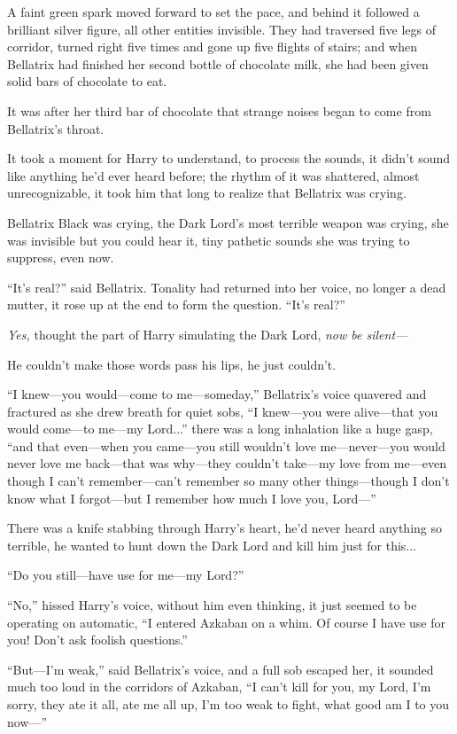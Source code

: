 \lettrine{A}{} faint green spark moved forward to set the pace, and behind it followed a brilliant silver figure, all other entities invisible. They had traversed five legs of corridor, turned right five times and gone up five flights of stairs; and when Bellatrix had finished her second bottle of chocolate milk, she had been given solid bars of chocolate to eat.

It was after her third bar of chocolate that strange noises began to come from Bellatrix’s throat.

It took a moment for Harry to understand, to process the sounds, it didn’t sound like anything he’d ever heard before; the rhythm of it was shattered, almost unrecognizable, it took him that long to realize that Bellatrix was crying.

Bellatrix Black was crying, the Dark Lord’s most terrible weapon was crying, she was invisible but you could hear it, tiny pathetic sounds she was trying to suppress, even now.

“It’s real?” said Bellatrix. Tonality had returned into her voice, no longer a dead mutter, it rose up at the end to form the question. “It’s real?”

\emph{Yes,} thought the part of Harry simulating the Dark Lord, \emph{now be silent—}

He couldn’t make those words pass his lips, he just couldn’t.

“I knew—you would—come to me—someday,” Bellatrix’s voice quavered and fractured as she drew breath for quiet sobs, “I knew—you were alive—that you would come—to me—my Lord...” there was a long inhalation like a huge gasp, “and that even—when you came—you still wouldn’t love me—never—you would never love me back—that was why—they couldn’t take—my love from me—even though I can’t remember—can’t remember so many other things—though I don’t know what I forgot—but I remember how much I love you, Lord—”

There was a knife stabbing through Harry’s heart, he’d never heard anything so terrible, he wanted to hunt down the Dark Lord and kill him just for this...

“Do you still—have use for me—my Lord?”

“No,” hissed Harry’s voice, without him even thinking, it just seemed to be operating on automatic, “I entered Azkaban on a whim. Of course I have use for you! Don’t ask foolish questions.”

“But—I’m weak,” said Bellatrix’s voice, and a full sob escaped her, it sounded much too loud in the corridors of Azkaban, “I can’t kill for you, my Lord, I’m sorry, they ate it all, ate me all up, I’m too weak to fight, what good am I to you now—”

